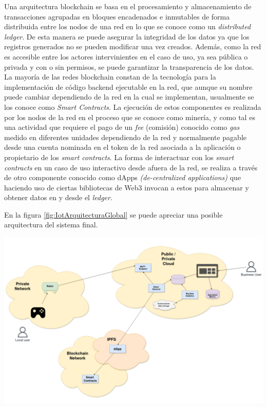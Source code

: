 \documentclass[
11pt, %
]{charter}
\begin{document}
Una arquitectura blockchain se basa en el procesamiento y almacenamiento de transacciones agrupadas en bloques encadenados e inmutables de forma distribuida entre los nodos de una red en lo que se conoce como un \textit{distributed ledger}. De esta manera se puede asegurar la integridad de los datos ya que los registros generados no se pueden modificar una vez creados. Además, como la red es accesible entre los actores intervinientes en el caso de uso, ya sea pública o privada y con o sin permisos, se puede garantizar la transparencia de los datos.
La mayoría de las redes blockchain constan de la tecnología para la implementación de código backend ejecutable en la red, que aunque su nombre puede cambiar dependiendo de la red en la cual se implementan, usualmente se los conoce como \textit{Smart Contracts}. La ejecución de estos componentes es realizada por los nodos de la red en el proceso que se conoce como minería, y como tal es una actividad que requiere el pago de un \textit{fee} (comisión) conocido como \textit{gas} medido en diferentes unidades dependiendo de la red y normalmente pagable desde una cuenta nominada en el token de la red asociada a la aplicación o propietario de los \textit{smart contracts}.
La  forma de interactuar con los \textit{smart contracts} en un caso de uso interactivo desde afuera de la red, se realiza a través de otro componente conocido como dApps \textit{(de-centralized applications)} que haciendo uso de ciertas bibliotecas de Web3 invocan a estos para almacenar y obtener datos en y desde el \textit{ledger}.

\vspace{8em}

En la figura \ref{fig:IotArquitecturaGlobal} se puede apreciar una posible arquitectura del sistema final.

\begin{center}
 \includegraphics[scale=0.25]{Figuras/IoTProject-Page-1.drawio}
 \label{fig:IotArquitecturaGlobal}
\end{center}
\end{document}
